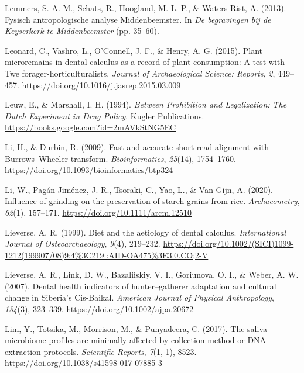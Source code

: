\documentclass[
  letterpaper,
]{book}
\newlength{\cslhangindent}
\newlength{\cslentryspacingunit} %
\newenvironment{CSLReferences}[2] %
 {%
  \setlength{\parindent}{0pt}
  \ifodd #1
  \let\oldpar\par
  \def\par{\hangindent=\cslhangindent\oldpar}
  \fi
  \setlength{\parskip}{#2\cslentryspacingunit}
 }%
 {}
\begin{document}
\begin{CSLReferences}{1}{0}
\leavevmode{}%
Lemmers, S. A. M., Schats, R., Hoogland, M. L. P., \& Waters-Rist, A.
(2013). Fysisch antropologische analyse Middenbeemster. In \emph{De
begravingen bij de Keyserkerk te Middenbeemster} (pp. 35--60).

\leavevmode{}%
Leonard, C., Vashro, L., O'Connell, J. F., \& Henry, A. G. (2015). Plant
microremains in dental calculus as a record of plant consumption: {A}
test with {Twe} forager-horticulturalists. \emph{Journal of
Archaeological Science: Reports}, \emph{2}, 449--457.
\url{https://doi.org/10.1016/j.jasrep.2015.03.009}

\leavevmode{}%
Leuw, E., \& Marshall, I. H. (1994). \emph{Between {Prohibition} and
{Legalization}: {The Dutch Experiment} in {Drug Policy}}. {Kugler
Publications}. \url{https://books.google.com?id=2mAVkStNG5EC}

\leavevmode{}%
Li, H., \& Durbin, R. (2009). Fast and accurate short read alignment
with {Burrows}--{Wheeler} transform. \emph{Bioinformatics},
\emph{25}(14), 1754--1760.
\url{https://doi.org/10.1093/bioinformatics/btp324}

\leavevmode{}%
Li, W., Pagán-Jiménez, J. R., Tsoraki, C., Yao, L., \& Van Gijn, A.
(2020). Influence of grinding on the preservation of starch grains from
rice. \emph{Archaeometry}, \emph{62}(1), 157--171.
\url{https://doi.org/10.1111/arcm.12510}

\leavevmode{}%
Lieverse, A. R. (1999). Diet and the aetiology of dental calculus.
\emph{International Journal of Osteoarchaeology}, \emph{9}(4), 219--232.
\url{https://doi.org/10.1002/(SICI)1099-1212(199907/08)9:4\%3C219::AID-OA475\%3E3.0.CO;2-V}

\leavevmode{}%
Lieverse, A. R., Link, D. W., Bazaliiskiy, V. I., Goriunova, O. I., \&
Weber, A. W. (2007). Dental health indicators of hunter--gatherer
adaptation and cultural change in {Siberia}'s {Cis-Baikal}.
\emph{American Journal of Physical Anthropology}, \emph{134}(3),
323--339. \url{https://doi.org/10.1002/ajpa.20672}

\leavevmode{}%
Lim, Y., Totsika, M., Morrison, M., \& Punyadeera, C. (2017). The saliva
microbiome profiles are minimally affected by collection method or {DNA}
extraction protocols. \emph{Scientific Reports}, \emph{7}(1, 1), 8523.
\url{https://doi.org/10.1038/s41598-017-07885-3}


\end{CSLReferences}
\end{document}
